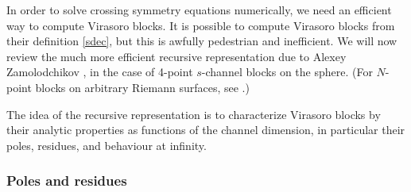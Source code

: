 \documentclass[12pt, a4paper]{article}
\theoremstyle{break}
\begin{document}
In order to solve crossing symmetry equations numerically, we need an efficient way to compute Virasoro blocks. It is possible to compute Virasoro blocks from their definition \eqref{sdec}, but this is awfully pedestrian and inefficient. We will now review the much more efficient recursive representation due to Alexey Zamolodchikov \cite{zam87b}, in the case of 4-point $s$-channel blocks on the sphere. (For $N$-point blocks on arbitrary Riemann surfaces, see \cite{ccy17}.)  

The idea of the recursive representation is to characterize Virasoro blocks by their analytic properties as functions of the channel dimension, in particular their poles, residues, and behaviour at infinity. 

\subsubsection{Poles and residues}
\end{document}
